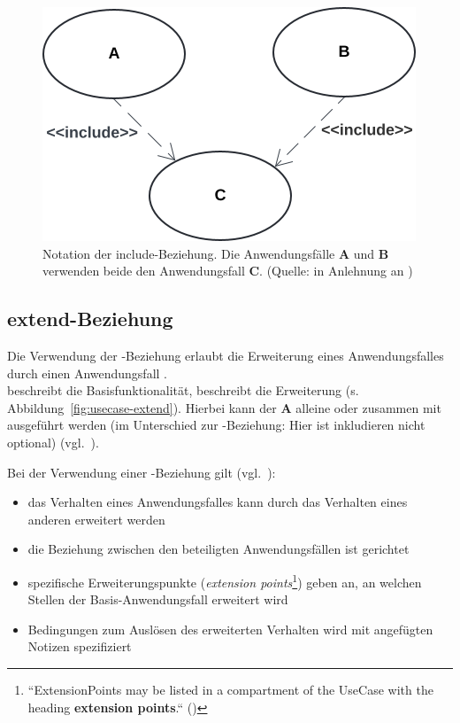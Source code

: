 \begin{figure}
    \centering
    \includegraphics[scale=0.4]{part three/Anwendungsfalldiagramm/img/usecase-include}
    \caption{Notation der include-Beziehung. Die Anwendungsfälle \textbf{A} und \textbf{B} verwenden beide den Anwendungsfall \textbf{C}. (Quelle: in Anlehnung an \cite[66, Abb. 2.8-5]{Bal05})}
    \label{fig:usecase-include}
\end{figure}


\subsection{extend-Beziehung}
Die Verwendung der -Beziehung erlaubt die Erweiterung eines Anwendungsfalles  durch einen Anwendungsfall .\\
 beschreibt die Basisfunktionalität,  beschreibt die Erweiterung (s. Abbildung~\ref{fig:usecase-extend}).
Hierbei kann der \textbf{A} alleine oder zusammen mit  ausgeführt werden (im Unterschied zur -Beziehung: Hier ist inkludieren nicht optional) (vgl.~\cite[54]{Bal05}).

\noindent
Bei der Verwendung einer -Beziehung gilt (vgl.~\cite[53]{Buh09}):

\begin{itemize}
    \item das Verhalten eines Anwendungsfalles kann durch das Verhalten eines anderen erweitert werden
    \item die Beziehung zwischen den beteiligten Anwendungsfällen ist gerichtet
    \item spezifische Erweiterungspunkte (\textit{extension points}\footnote{
        ``ExtensionPoints may be listed in a compartment of the UseCase with the heading \textbf{extension points}.`` (\cite[642, Hervorhebung i.O.]{OMG17})
    }) geben an, an welchen Stellen der Basis-Anwendungsfall erweitert wird
    \item Bedingungen zum Auslösen des erweiterten Verhalten wird mit angefügten Notizen spezifiziert
\end{itemize}

